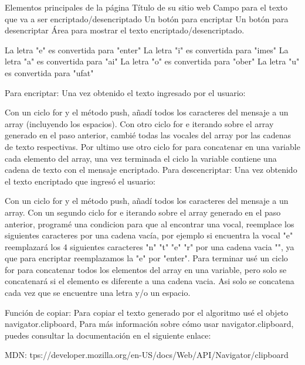 Elementos principales de la página
    Título de su sitio web
    Campo para el texto que va a ser encriptado/desencriptado
    Un botón para encriptar
    Un botón para desencriptar
    Área para mostrar el texto encriptado/desencriptado.

La letra "e" es convertida para "enter"
La letra "i" es convertida para "imes"
La letra "a" es convertida para "ai"
La letra "o" es convertida para "ober"
La letra "u" es convertida para "ufat"

Para encriptar:
Una vez obtenido el texto ingresado por el usuario:

Con un ciclo for y el método push, añadí todos los caracteres del mensaje a un array (incluyendo los espacios).
Con otro ciclo for e iterando sobre el array generado en el paso anterior, cambié todas las vocales del array por las cadenas de texto respectivas.
Por ultimo use otro ciclo for para concatenar en una variable cada elemento del array, una vez terminada el ciclo la variable contiene una cadena de texto con el mensaje encriptado.
Para descencriptar:
Una vez obtenido el texto encriptado que ingresó el usuario:

Con un ciclo for y el método push, añadí todos los caracteres del mensaje a un array.
Con un segundo ciclo for e iterando sobre el array generado en el paso anterior, programé una condicion para que al encontrar una vocal, reemplace los siguientes caracteres por una cadena vacía, por ejemplo si encuentra la vocal "e" reemplazará los 4 siguientes caracteres "n" "t" "e" "r" por una cadena vacia "", ya que para encriptar reemplazamos la "e" por "enter".
Para terminar usé un ciclo for para concatenar todos los elementos del array en una variable, pero solo se concatenará si el elemento es diferente a una cadena vacia. Asi solo se concatena cada vez que se encuentre una letra y/o un espacio.

Función de copiar:
Para copiar el texto generado por el algoritmo usé el objeto navigator.clipboard, Para más información sobre cómo usar navigator.clipboard, puedes consultar la documentación en el siguiente enlace:

MDN: tps://developer.mozilla.org/en-US/docs/Web/API/Navigator/clipboard

